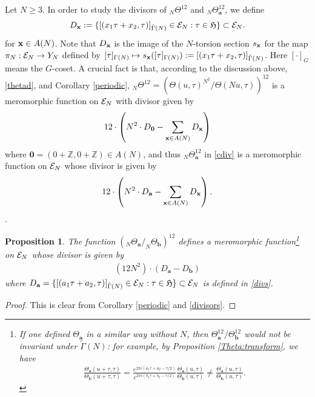 \documentclass[12pt,amstex,amssymb]{article}
\theoremstyle{plain}
\newtheorem{proposition}[theorem]{Proposition}
\theoremstyle{definition}
\def\cE{{\cal E}}
\def\fH{{\frak H}}
\def\Z{{\mathbb Z}}
\def\ker{\text{ker}}
\def\bx {{\bf x}}
\newcommand{\be}{\begin{eqnarray*}}
\newcommand{\ee}{\end{eqnarray*}}
\newcommand{\bea}{\begin{eqnarray}}
\newcommand{\eea}{\end{eqnarray}}
\newcommand{\ba}{\mathbf{a}}
\newcommand{\bb}{\mathbf{b}}
\begin{document}
Let $N\geq 3$. In order to study the divisors of $_{N}\!\Theta^{12}$ and $_{N}\!\Theta^{12}_\ba$, we define
\bea \label{divs}
D_\bx:=\{[(x_1\tau+x_2, \tau)]_{\tilde \Gamma(N)} \in \cE_N: \tau \in \fH \} \subset \cE_N.
\eea
for $\bx \in A(N)$. Note that $D_\bx$ is the image of the $N$-torsion section $s_\bx$ for the map $\pi_N:\cE_N \to Y_N$ defined by $[\tau]_{\Gamma(N)} \mapsto s_\bx([\tau]_{\Gamma(N)}):=[(x_1\tau+x_2, \tau)]_{\tilde \Gamma(N)}$. Here $[\cdot ]_G$ means the $G$-coset.
 A crucial fact is that, according to the discussion above, \eqref{thetad}, and Corollary \ref{periodic}, $_{N}\!\Theta^{12}=\left( \Theta(u,\tau)^{N^2}/\Theta(Nu,\tau) \right)^{12}$ is a meromorphic function on $\cE_N$ with divisor given by
$$
12 \cdot \left( N^2\cdot D_{\mathbf{0}}  - \sum_{\bx\in A(N)} D_\bx\right)
$$
where $\mathbf{0} =(0+\Z,0+\Z) \in A(N)$, and thus $_{N}\!\Theta_{\ba}^{12}$  in \eqref{cdiv} is a meromorphic function on $\cE_N$ whose divisor is given by
\bea \label{divisors}
12 \cdot \left( N^2\cdot  D_\ba  - \sum_{\bx\in A(N)} {D_\bx}\right).
\eea.
 
 






\begin{proposition}\label{dcomputation}
	The function $(_{N}\!\Theta_{\ba}/_{N}\!\Theta_{\bb})^{12}$ defines a meromorphic function\footnote{If one defined $\Theta_{\ba}$ in a similar way without $N$, then $\Theta_{\ba}^{12}/\Theta_{\bb}^{12}$ would not be invariant under $\tilde \Gamma(N)$: for example, by Proposition \ref{Theta:transform}, we have
\be
\frac{\Theta_{\ba}(u+\tau,\tau)}{\Theta_{\bb}(u+\tau,\tau)}= \frac{e^{2\pi i (a_1 \tau +a_2 -\tau/2)}}{e^{2\pi i (b_1 \tau +b_2 -\tau/2)} }\frac{\Theta_{\ba}(u,\tau)}{\Theta_{\bb}(u,\tau)}\neq \frac{\Theta_{\ba}(u,\tau)}{\Theta_{\bb}(u,\tau)}.
\ee
}
on $\cE_N$ whose divisor is given by
	\bea\label{tdiv}
	(12N^2)\cdot \left( D_\ba - D_\bb \right)
	\eea
	where
	$D_\ba=\{[(a_1\tau+a_2, \tau)]_{\tilde \Gamma(N)} \in \cE_N: \tau \in \fH \} \subset \cE_N$ is defined in \eqref{divs}.
	
\end{proposition}


\begin{proof}
This is clear from Corollary \ref{periodic} and \eqref{divisors}.
\end{proof}
\end{document}
